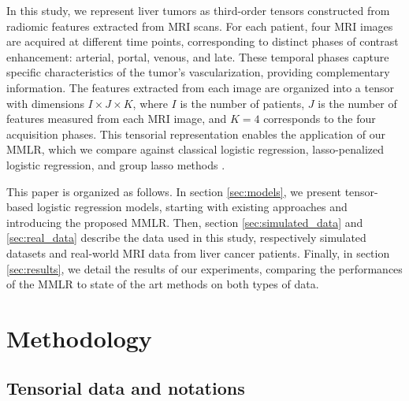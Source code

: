 \documentclass[preprint,12pt]{elsarticle}
\begin{document}
In this study, we represent liver tumors as third-order tensors constructed from radiomic features extracted from MRI scans. For each patient, four MRI images are acquired at different time points, corresponding to distinct phases of contrast enhancement: arterial, portal, venous, and late. These temporal phases capture specific characteristics of the tumor's vascularization, providing complementary information. The features extracted from each image are organized into a tensor with dimensions \( I \times J \times K \), where \( I \) is the number of patients, \( J \) is the number of features measured from each MRI image, and \( K = 4 \) corresponds to the four acquisition phases. This tensorial representation enables the application of our MMLR, which we compare against classical logistic regression, lasso-penalized logistic regression, and group lasso methods \cite{grp_lasso}.

This paper is organized as follows. In section \ref{sec:models}, we present tensor-based logistic regression models, starting with existing approaches and introducing the proposed MMLR. Then, section \ref{sec:simulated_data} and \ref{sec:real_data} describe the data used in this study, respectively simulated datasets and real-world MRI data from liver cancer patients. Finally, in section \ref{sec:results}, we detail the results of our experiments, comparing the performances of the MMLR to state of the art methods on both types of data. 


\section{Methodology}
\label{sec:methodo}

\subsection{Tensorial data and notations}
\end{document}

